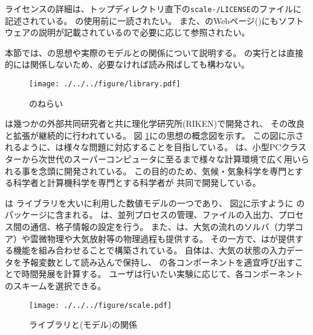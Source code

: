 ライセンスの詳細は、トップディレクトリ直下の\texttt{scale-\version/LICENSE}のファイルに記述されている。
\scalelib の使用前に一読されたい。
また、\scalelib のWebページ(\scaleweb)にもソフトウェアの説明が記載されているので必要に応じて参照されたい。

本節では、\scalelib の思想や実際のモデルとの関係について説明する。
\scalerm の実行とは直接的には関係しないため、必要なければ読み飛ばしても構わない。


\begin{figure}[htb]
\begin{center}
  \texttt{[image: ./../../figure/library.pdf]}\\
  \caption{\scalelib のねらい}
  \label{fig:scale}
\end{center}
\end{figure}

\scalelib は幾つかの外部共同研究者と共に理化学研究所(RIKEN)で開発され、
その改良と拡張が継続的に行われている。
図 \ref{fig:scale}に\scalelib の思想の概念図を示す。
この図に示されるように、\scalelib は様々な問題に対応することを目指している。
\scalelib は、小型PCクラスターから次世代のスーパーコンピュータに至るまで様々な計算環境で広く用いられる事を念頭に開発されている。
この目的のため、気候・気象科学を専門とする科学者と計算機科学を専門とする科学者が
共同で開発している。

\scalerm は \scalelib ライブラリを大いに利用した数値モデルの一つであり、
図\ref{fig:scale-rm}に示すように \scalelib のパッケージに含まれる。
\scalelib は、並列プロセスの管理、ファイルの入出力、プロセス間の通信、格子情報の設定を行う。
また、\scalelib は、大気の流れのソルバ（力学コア）や雲微物理や大気放射等の物理過程も提供する。
その一方で、\scalerm は\scalelib が提供する機能を組み合わせることで構築されている。
\scalerm 自体は、大気の状態の入力データを予報変数として読み込んで保持し、
\scalelib の各コンポーネントを適宜呼び出すことで時間発展を計算する。
ユーザは行いたい実験に応じて、各コンポーネントのスキームを選択できる。

\begin{figure}[hbt]
\begin{center}
  \texttt{[image: ./../../figure/scale.pdf]}\\
  \caption{{\scalelib}ライブラリと{\scalerm}(モデル)の関係}
  \label{fig:scale-rm}
\end{center}
\end{figure}



